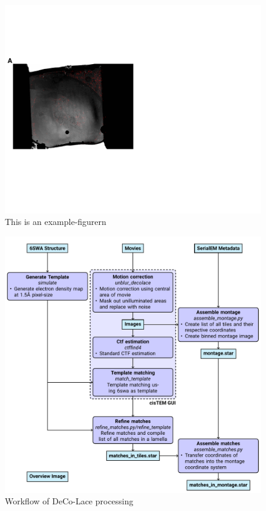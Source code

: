 \documentclass[
]{article}
\begin{document}
\begin{figure}
\hypertarget{fig:matching}{%
\centering
\includegraphics{figures/matching.pdf}
\caption{This is an example-figurern}\label{fig:matching}
}
\end{figure}

\begin{figure}
\hypertarget{fig:deco_lace_workflow}{%
\centering
\includegraphics{figures/deco_lace_workflow.pdf}
\caption{Workflow of DeCo-Lace processing}\label{fig:deco_lace_workflow}
}
\end{figure}
\end{document}
